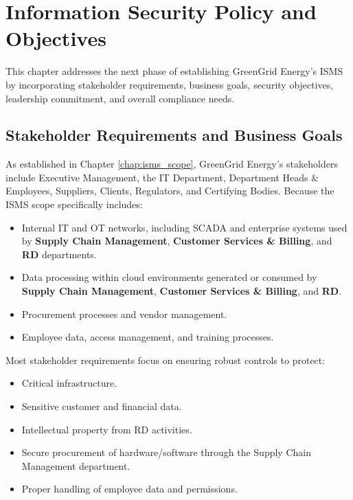\chapter{Information Security Policy and Objectives}
\label{chap:infosec_policy_objectives}
This chapter addresses the next phase of establishing GreenGrid Energy’s
\ac{ISMS} by incorporating
stakeholder requirements, business goals, security objectives, leadership
commitment, and overall compliance needs.

\section{Stakeholder Requirements and Business Goals}
\label{sec:stakeholder_req}

As established in Chapter \ref{chap:isms_scope}, GreenGrid Energy’s stakeholders include
Executive Management, the \ac{IT} Department, Department Heads \& Employees,
Suppliers, Clients, Regulators, and Certifying Bodies. Because the
\ac{ISMS} scope specifically includes:
\begin{itemize}
      \item Internal \ac{IT} and \ac{OT} networks, including \ac{SCADA} and
            enterprise systems used by \textbf{Supply Chain Management},
            \textbf{Customer Services \& Billing}, and \textbf{\ac{RD}} departments.
      \item Data processing within cloud environments generated
            or consumed by \textbf{Supply Chain Management}, \textbf{Customer Services \&
                  Billing}, and \textbf{\ac{RD}}.
      \item Procurement processes and vendor management.
      \item Employee data, access management, and training processes.
\end{itemize}
Most stakeholder requirements focus on ensuring robust controls to protect:
\begin{itemize}
      \item Critical infrastructure.
      \item Sensitive customer and financial data.
      \item Intellectual property from \ac{RD} activities.
      \item Secure procurement of hardware/software through the Supply
            Chain Management department.
      \item Proper handling of employee data and permissions.
\end{itemize}

